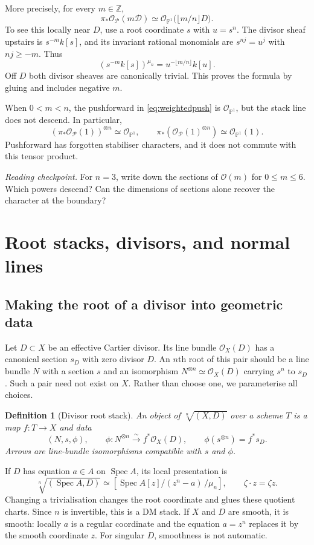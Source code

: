 \documentclass[11pt,a4paper]{article}
\numberwithin{equation}{section}
\newtheorem{definition}[proposition]{Definition}
\theoremstyle{definition}
\newcommand{\PP}{\mathbb P}
\newcommand{\OO}{\mathcal O}
\newcommand{\cD}{\mathcal D}
\newcommand{\cP}{\mathcal P}
\newcommand{\Spec}{\operatorname{Spec}}
\newcommand{\reading}[1]{\par\smallskip\textit{Reading checkpoint.} #1\par}
\begin{document}
More precisely, for every $m\in\mathbb Z$,
\begin{equation}\label{eq:weightedpush}
 \pi_*\OO_{\cP}(m\cD)
 \simeq\OO_{\PP^1}\bigl(\lfloor m/n\rfloor D\bigr).
\end{equation}
To see this locally near $D$, use a root coordinate $s$ with $u=s^n$.
The divisor sheaf upstairs is $s^{-m}k[s]$, and its invariant rational
monomials are $s^{nj}=u^j$ with $nj\ge-m$. Thus
\[
 (s^{-m}k[s])^{\mu_n}=u^{-\lfloor m/n\rfloor}k[u].
\]
Off $D$ both divisor sheaves are canonically trivial. This proves the formula
by gluing and includes negative $m$.

When $0<m<n$, the pushforward in \eqref{eq:weightedpush} is $\OO_{\PP^1}$,
but the stack line does not descend. In particular,
\[
 (\pi_*\OO_{\cP}(1))^{\otimes n}\simeq\OO_{\PP^1},\qquad
 \pi_*(\OO_{\cP}(1)^{\otimes n})\simeq\OO_{\PP^1}(1).
\]
Pushforward has forgotten stabiliser characters, and it does not commute
with this tensor product.

\reading{For $n=3$, write down the sections of $\OO(m)$ for $0\le m\le6$.
Which powers descend? Can the dimensions of sections alone recover the
character at the boundary?}

\section{Root stacks, divisors, and normal lines}
\label{sec:roots}

\subsection{Making the root of a divisor into geometric data}
Let $D\subset X$ be an effective Cartier divisor. Its line bundle $\OO_X(D)$
has a canonical section $s_D$ with zero divisor $D$. An $n$th root of this
pair should be a line bundle $N$ with a section $s$ and an isomorphism
$N^{\otimes n}\simeq\OO_X(D)$ carrying $s^n$ to $s_D$. Such a pair
need not exist on $X$. Rather than choose one, we parameterise all choices.

\begin{definition}[Divisor root stack]
An object of $\sqrt[n]{(X,D)}$ over a scheme $T$ is a map $f:T\to X$ and
data
\[
 (N,s,\phi),\qquad
 \phi:N^{\otimes n}\xrightarrow{\sim}f^*\OO_X(D),\qquad
 \phi(s^{\otimes n})=f^*s_D.
\]
Arrows are line-bundle isomorphisms compatible with $s$ and $\phi$.
\end{definition}

If $D$ has equation $a\in A$ on $\Spec A$, its local presentation is
\begin{equation}\label{eq:rootchart}
 \sqrt[n]{(\Spec A,D)}
 \simeq\left[\Spec A[z]/(z^n-a)\,/\mu_n\right],\qquad
 \zeta\cdot z=\zeta z.
\end{equation}
Changing a trivialisation changes the root coordinate and glues these
quotient charts. Since $n$ is invertible, this is a DM stack. If $X$ and
$D$ are smooth, it is smooth: locally $a$ is a regular coordinate and the
equation $a=z^n$ replaces it by the smooth coordinate $z$. For singular
$D$, smoothness is not automatic.
\end{document}
